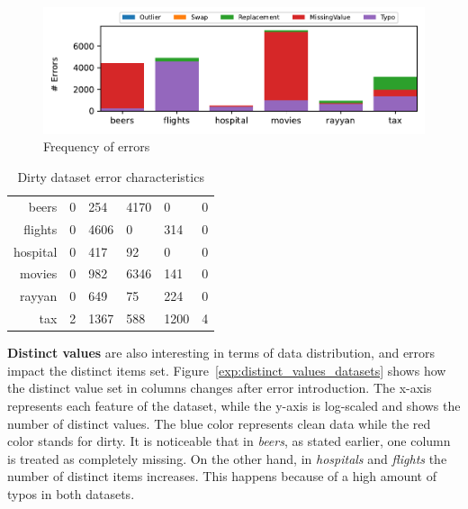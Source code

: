 \begin{figure}[!t]
    \centering
    \includegraphics[width=\textwidth]{figures/plot/error_percent/errors.pdf}
    \caption{Frequency of errors}
    \label{exp:errors_count}
\end{figure}

\begin{table}[!t]
\centering
\caption{\label{tab:dirty_num_errors}Dirty dataset error characteristics}
\begin{tabular}{r|K|K|K|K|K}
\toprule
                     &  &  &              &               &    \\ \midrule
beers                & 0        & 254   & 4170           & 0                & 0       \\
flights              & 0        & 4606  & 0              & 314              & 0       \\
hospital             & 0        & 417   & 92             & 0                & 0       \\
movies               & 0        & 982   & 6346           & 141              & 0       \\
rayyan               & 0        & 649   & 75             & 224              & 0       \\
tax                  & 2        & 1367  & 588            & 1200             & 4       \\ \bottomrule
\end{tabular}
\end{table}

\textbf{Distinct values} are also interesting in terms of data distribution, and errors impact the distinct items set.
Figure~\ref{exp:distinct_values_datasets} shows how the distinct value set in columns changes after error introduction. 
The x-axis represents each feature of the dataset, while the y-axis is log-scaled and shows the number of distinct values. 
The blue color represents clean data while the red color stands for dirty.
It is noticeable that in \textit{beers}, as stated earlier, one column is treated as completely missing.
On the other hand, in \textit{hospitals} and \textit{flights} the number of distinct items increases.
This happens because of a high amount of typos in both datasets.

